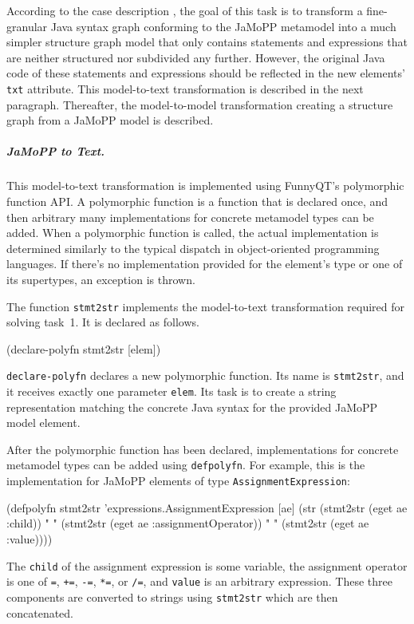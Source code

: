 \documentclass[submission]{eptcs}
\begin{document}
According to the case description \cite{flowgraphcasedesc}, the goal of this
task is to transform a fine-granular Java syntax graph conforming to the JaMoPP
metamodel \cite{jamopp09} into a much simpler structure graph model that only
contains statements and expressions that are neither structured nor subdivided
any further.  However, the original Java code of these statements and
expressions should be reflected in the new elements' \verb|txt| attribute.
This model-to-text transformation is described in the next paragraph.
Thereafter, the model-to-model transformation creating a structure graph from a
JaMoPP model is described.


\subparagraph{JaMoPP to Text.}
\label{sec:jamopp-text}

This model-to-text transformation is implemented using FunnyQT's polymorphic
function API.  A polymorphic function is a function that is declared once, and
then arbitrary many implementations for concrete metamodel types can be added.
When a polymorphic function is called, the actual implementation is determined
similarly to the typical dispatch in object-oriented programming languages.  If
there's no implementation provided for the element's type or one of its
supertypes, an exception is thrown.

The function \verb|stmt2str| implements the model-to-text transformation
required for solving task~1.  It is declared as follows.

\begin{clojurecode}
(declare-polyfn stmt2str [elem])
\end{clojurecode}

\verb|declare-polyfn| declares a new polymorphic function.  Its name is
\verb|stmt2str|, and it receives exactly one parameter \verb|elem|.  Its task
is to create a string representation matching the concrete Java syntax for the
provided JaMoPP model element.

After the polymorphic function has been declared, implementations for concrete
metamodel types can be added using \verb|defpolyfn|.  For example, this is the
implementation for JaMoPP elements of type \verb|AssignmentExpression|:

\begin{clojurecode}
(defpolyfn stmt2str 'expressions.AssignmentExpression [ae]
  (str (stmt2str (eget ae :child)) " "
       (stmt2str (eget ae :assignmentOperator)) " "
       (stmt2str (eget ae :value))))
\end{clojurecode}

The \verb|child| of the assignment expression is some variable, the assignment
operator is one of \verb|=|, \verb|+=|, \verb|-=|, \verb|*=|, or \verb|/=|, and
\verb|value| is an arbitrary expression.  These three components are converted
to strings using \verb|stmt2str| which are then concatenated.
\end{document}
